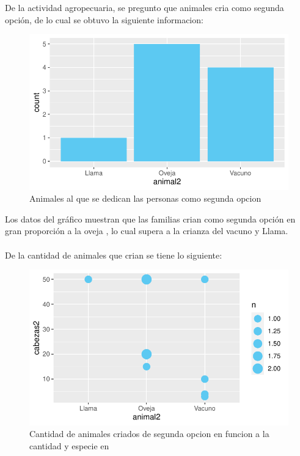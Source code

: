 \documentclass[12pt]{article}\usepackage[]{graphicx}\usepackage[]{xcolor}
\makeatletter
\def\maxwidth{ %
  \ifdim\Gin@nat@width>\linewidth
    \linewidth
  \else
    \Gin@nat@width
  \fi
}
\newenvironment{knitrout}{}{} %
\makeatother
\begin{document}
	De la actividad agropecuaria, se pregunto que animales cria como segunda opción, de lo cual se obtuvo la siguiente informacion:
	\begin{figure}[H]
	\centering
\begin{knitrout}
\color{fgcolor}
\includegraphics[width=\maxwidth]{figure/eighteen-1} 
\end{knitrout}
	\caption{Animales al que se dedican las personas como segunda opcion}
	\end{figure}
	Los datos del gráfico muestran que las familias crian como segunda opción en gran proporción a la oveja , lo cual supera a la crianza del vacuno y Llama.\\
	\\
	De la cantidad de animales que crian se tiene lo siguiente:
	\begin{figure}[H]
	\centering
\begin{knitrout}
\color{fgcolor}
\includegraphics[width=\maxwidth]{figure/nineteen-1} 
\end{knitrout}
	\caption{Cantidad de animales criados de segunda opcion en funcion a la cantidad y especie en \comunidad}
	\end{figure}
\end{document}

